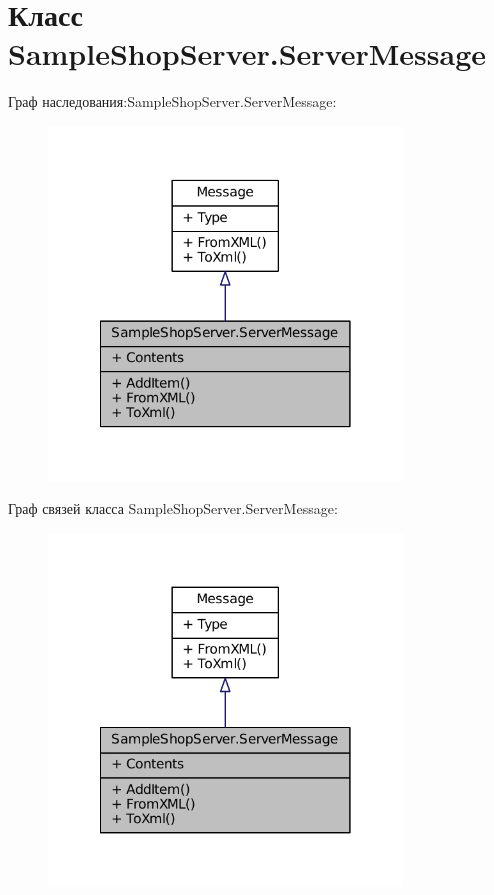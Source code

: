 \hypertarget{class_sample_shop_server_1_1_server_message}{}\section{Класс Sample\+Shop\+Server.\+Server\+Message}
\label{class_sample_shop_server_1_1_server_message}


Граф наследования\+:Sample\+Shop\+Server.\+Server\+Message\+:
\nopagebreak
\begin{figure}[H]
\begin{center}
\leavevmode
\includegraphics[width=266pt]{class_sample_shop_server_1_1_server_message__inherit__graph}
\end{center}
\end{figure}


Граф связей класса Sample\+Shop\+Server.\+Server\+Message\+:
\nopagebreak
\begin{figure}[H]
\begin{center}
\leavevmode
\includegraphics[width=266pt]{class_sample_shop_server_1_1_server_message__coll__graph}
\end{center}
\end{figure}
